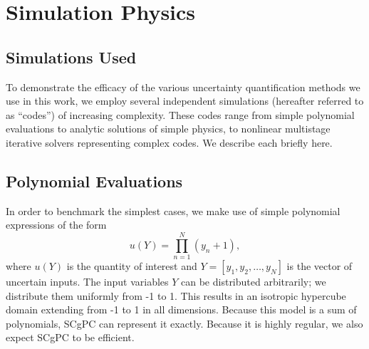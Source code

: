 
\chapter{Simulation Physics} %

\label{ch:models} %



\section{Simulations Used}
To demonstrate the efficacy of the various uncertainty quantification methods we use in this work, we employ
several independent simulations (hereafter referred to as ``codes'') of increasing complexity.  These codes
range from simple polynomial evaluations to analytic solutions of simple physics, to nonlinear multistage
iterative solvers representing complex codes.  We describe each briefly here.

\section{Polynomial Evaluations}
In order to benchmark the simplest cases, we make use of simple polynomial expressions of the form
\begin{equation}
  u(Y) = \prod_{n=1}^N (y_n+1),
\end{equation}
where $u(Y)$ is the quantity of interest and $Y=[y_1,y_2,\ldots,y_N]$ is the vector of uncertain inputs.
The input variables $Y$ can be distributed arbitrarily; we distribute them uniformly from -1 to 1.  This
results in an isotropic hypercube domain extending from -1 to 1 in all dimensions.  
Because this model is a sum of polynomials, SCgPC can represent it exactly.  Because it is highly regular, we
also expect SCgPC to be efficient.




